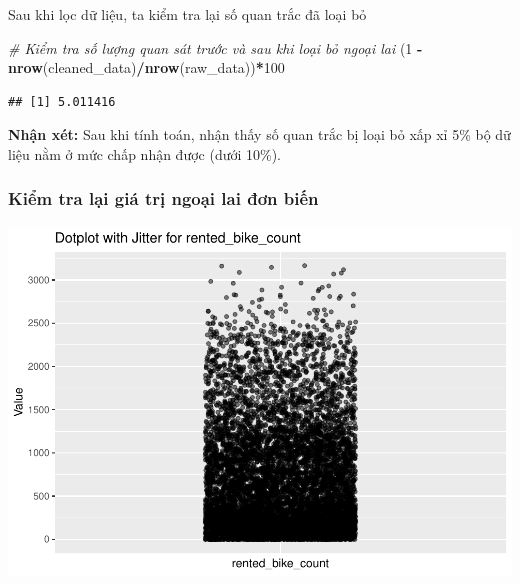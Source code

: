 \documentclass[
  11pt,
  letterpaper,
]{article}
\newenvironment{Shaded}{\begin{snugshade}}{\end{snugshade}}
\newcommand{\CommentTok}[1]{\textcolor[rgb]{0.56,0.35,0.01}{\textit{#1}}}
\newcommand{\DecValTok}[1]{\textcolor[rgb]{0.00,0.00,0.81}{#1}}
\newcommand{\FunctionTok}[1]{\textcolor[rgb]{0.13,0.29,0.53}{\textbf{#1}}}
\newcommand{\NormalTok}[1]{#1}
\newcommand{\SpecialCharTok}[1]{\textcolor[rgb]{0.81,0.36,0.00}{\textbf{#1}}}
\begin{document}
Sau khi lọc dữ liệu, ta kiểm tra lại số quan trắc đã loại bỏ

\begin{Shaded}
\begin{Highlighting}[]
\CommentTok{\# Kiểm tra số lượng quan sát trước và sau khi loại bỏ ngoại lai}
\NormalTok{(}\DecValTok{1} \SpecialCharTok{{-}} \FunctionTok{nrow}\NormalTok{(cleaned\_data)}\SpecialCharTok{/}\FunctionTok{nrow}\NormalTok{(raw\_data))}\SpecialCharTok{*}\DecValTok{100}
\end{Highlighting}
\end{Shaded}

\begin{verbatim}
## [1] 5.011416
\end{verbatim}

\textbf{Nhận xét:} Sau khi tính toán, nhận thấy số quan trắc bị loại bỏ xấp xỉ 5\% bộ dữ liệu nằm ở mức chấp nhận được (dưới 10\%).

\subsubsection{Kiểm tra lại giá trị ngoại lai đơn biến}

\begin{center}\includegraphics[width=1.2\linewidth,]{Final_Project_files/figure-latex/unnamed-chunk-13-1} \end{center}
\end{document}
